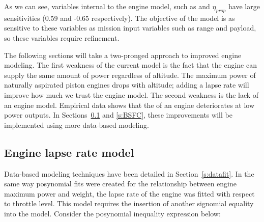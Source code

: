 \begin{footnotesize}
\end{footnotesize}

As we can see, variables internal to the engine model, such as \BSFC and $\eta_{prop}$ have
large sensitivities (0.59 and -0.65 respectively). The objective of the model
is as sensitive to these variables as mission input variables such as range and payload, so
these variables require refinement.

The following sections will take a two-pronged approach to improved engine modeling.
The first weakness of the current model is the fact that the engine can supply the same amount of power
regardless of altitude. The maximum power of naturally aspirated piston engines drops
with altitude; adding a lapse rate will improve how much we trust the engine model.
The second weakness is the lack of an engine \BSFC model. Empirical data shows that the
\BSFC of an engine deteriorates at low power outputs.
In Sections~\ref{s:lapse} and \ref{s:BSFC}, these improvements will be implemented using more data-based modeling.

\subsection{Engine lapse rate model}
\label{s:lapse}

Data-based modeling techniques have been detailed in Section~\ref{s:datafit}.
In the same way posynomial fits were created for the relationship between
engine maximum power and weight, the lapse rate of the engine was fitted with respect to throttle level.
This model requires the insertion of another signomial equality into the model. Consider the
posynomial inequality expression below:

